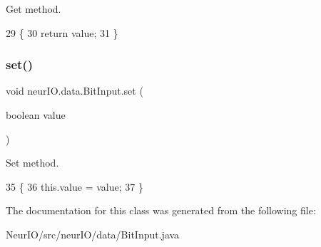 Get method. 
\begin{DoxyCode}
29                         \{
30         \textcolor{keywordflow}{return} value;
31     \}
\end{DoxyCode}
\mbox{\label{classneur_i_o_1_1data_1_1_bit_input_ac1daaa68035a42bbc803ade1153861c5}} 
\subsubsection{\texorpdfstring{set()}{set()}}
{\footnotesize\ttfamily void neur\+I\+O.\+data.\+Bit\+Input.\+set (\begin{DoxyParamCaption}\item[{boolean}]{value }\end{DoxyParamCaption})}

Set method. 
\begin{DoxyCode}
35                                    \{
36         this.value = value;
37     \}
\end{DoxyCode}


The documentation for this class was generated from the following file\+:\begin{DoxyCompactItemize}
\item 
Neur\+I\+O/src/neur\+I\+O/data/Bit\+Input.\+java\end{DoxyCompactItemize}
